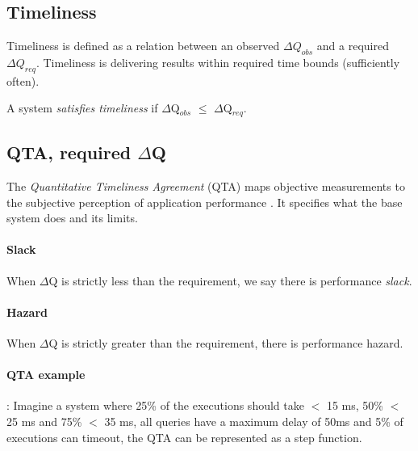     \subsection{Timeliness}
        Timeliness is defined as a relation between an observed $\Delta Q_{obs}$ and a required $\Delta Q_{req}$. Timeliness is delivering results within required time bounds (sufficiently often). 

        A system \textit{satisfies timeliness} if $\Delta$Q$_{obs}$ $\le$ $\Delta$Q$_{req}$.
     
    \subsection{QTA, required $\Delta$Q}
         The \textit{Quantitative Timeliness Agreement} (QTA) maps objective measurements to the subjective perception of application performance \cite{dq-br}. It specifies what the base system does and its limits.
    
    \paragraph{Slack} When $\Delta$Q is strictly less than the requirement, we say there is performance \textit{slack}.

        \paragraph{Hazard} When $\Delta$Q is strictly greater than the requirement, there is performance hazard.
    
    \paragraph{QTA example}: Imagine a system where 25\% of the executions should take $<$ 15 ms, 50\% $<$ 25 ms and 75\% $<$ 35 ms, all queries have a maximum delay of 50ms and 5\% of executions can timeout, the QTA can be represented as a step function.
    
